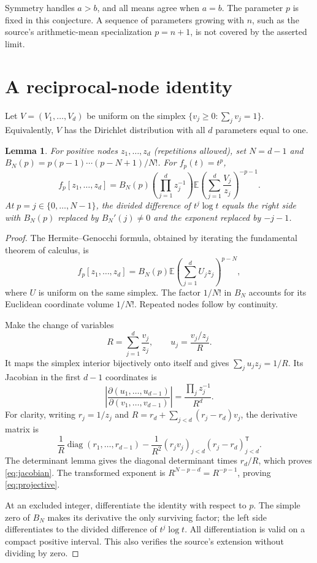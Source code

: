 \documentclass[11pt]{article}
\newtheorem{lemma}{Lemma}
\newcommand{\E}{\mathbb E}
\begin{document}
Symmetry handles $a>b$, and all means agree when $a=b$. The parameter
$p$ is fixed in this conjecture. A sequence of parameters growing with
$n$, such as the source's arithmetic-mean specialization $p=n+1$, is
not covered by the asserted limit.

\section*{A reciprocal-node identity}
Let $V=(V_1,\ldots,V_d)$ be uniform on the simplex
$\{v_j\ge0:\sum_j v_j=1\}$. Equivalently, $V$ has the
Dirichlet distribution with all $d$ parameters equal to one.

\begin{lemma}\label{lem:projective}
For positive nodes $z_1,\ldots,z_d$ (repetitions allowed), set
$N=d-1$ and
$B_N(p)=p(p-1)\cdots(p-N+1)/N!$. For $f_p(t)=t^p$,
\begin{equation}\label{eq:projective}
f_p[z_1,\ldots,z_d]
 =B_N(p)\left(\prod_{j=1}^d z_j^{-1}\right)
   \E\left(\sum_{j=1}^d\frac{V_j}{z_j}\right)^{-p-1}.
\end{equation}
At $p=j\in\{0,\ldots,N-1\}$, the divided difference of $t^j\log t$
equals the right side with $B_N(p)$ replaced by $B_N'(j)\ne0$ and
the exponent replaced by $-j-1$.
\end{lemma}
\begin{proof}
The Hermite--Genocchi formula, obtained by iterating the fundamental
theorem of calculus, is
\[
f_p[z_1,\ldots,z_d]=B_N(p)\E\left(\sum_{j=1}^d U_jz_j\right)^{p-N},
\]
where $U$ is uniform on the same simplex. The factor $1/N!$ in $B_N$
accounts for its Euclidean coordinate volume $1/N!$.
Repeated nodes follow by continuity.

Make the change of variables
\[
R=\sum_{j=1}^d\frac{v_j}{z_j},\qquad
u_j=\frac{v_j/z_j}{R}.
\]
It maps the simplex interior bijectively onto itself and gives
$\sum_j u_jz_j=1/R$. Its Jacobian in the first $d-1$ coordinates is
\begin{equation}\label{eq:jacobian}
\left|\frac{\partial(u_1,\ldots,u_{d-1})}
 {\partial(v_1,\ldots,v_{d-1})}\right|
 =\frac{\prod_j z_j^{-1}}{R^d}.
\end{equation}
For clarity, writing $r_j=1/z_j$ and
$R=r_d+\sum_{j<d}(r_j-r_d)v_j$, the derivative matrix is
\[
\frac1R\operatorname{diag}(r_1,\ldots,r_{d-1})
 -\frac1{R^2}(r_jv_j)_{j<d}(r_j-r_d)_{j<d}^{\mathsf T}.
\]
The determinant lemma gives the diagonal determinant times $r_d/R$,
which proves \eqref{eq:jacobian}. The transformed exponent is
$R^{N-p-d}=R^{-p-1}$, proving \eqref{eq:projective}.

At an excluded integer, differentiate the identity with respect to $p$.
The simple zero of $B_N$ makes its derivative the only surviving factor;
the left side differentiates to the divided difference of $t^j\log t$.
All differentiation is valid on a compact positive interval. This also
verifies the source's extension without dividing by zero.
\end{proof}
\end{document}
